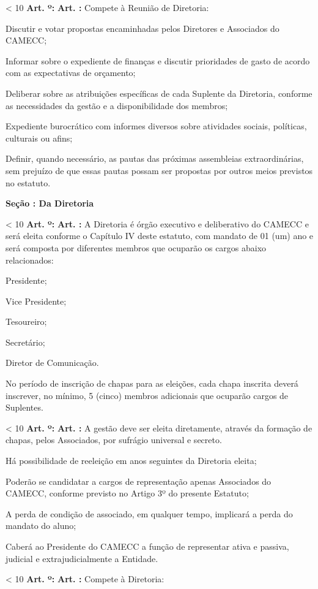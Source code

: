 \documentclass[capitulo]{br-lex}
\newcounter{chap}
\newcounter{sec}
\newcounter{art}
\newcommand{\secao}[1]{
    \vspace{20pt}
    \textbf{Seção \Roman{sec}: #1}
    \stepcounter{sec}
}
\renewcommand{\artigo}{
    \ifnum\value{art} < 10
        \textbf{Art. \arabic{art}º:}
    \else
        \textbf{Art. \arabic{art}:}
    \fi
    \stepcounter{art}
    \setcounter{inciso}{0}
    \setcounter{paragrafo}{0}
}
\begin{document}
\artigo Compete à Reunião de Diretoria:

\inciso Discutir e votar propostas encaminhadas pelos Diretores e Associados do CAMECC;

\inciso Informar sobre o expediente de finanças e discutir prioridades de gasto de acordo com as expectativas de orçamento;

\inciso Deliberar sobre as atribuições específicas de cada Suplente da Diretoria, conforme as necessidades da gestão e a disponibilidade dos membros;

\inciso Expediente burocrático com informes diversos sobre atividades sociais, políticas, culturais ou afins;

\inciso Definir, quando necessário, as pautas das próximas assembleias extraordinárias, sem prejuízo de que essas pautas possam ser propostas por outros meios previstos no estatuto.

\secao{Da Diretoria}

\artigo A Diretoria é órgão executivo e deliberativo do CAMECC e será eleita conforme o Capítulo IV deste estatuto, com mandato de 01 (um) ano e será composta por diferentes membros que ocuparão os cargos abaixo relacionados:

\inciso Presidente;

\inciso Vice Presidente;

\inciso Tesoureiro;

\inciso Secretário;

\inciso Diretor de Comunicação.

\paragrafounico No período de inscrição de chapas para as eleições, cada chapa inscrita deverá inscrever, no mínimo, 5 (cinco) membros adicionais que ocuparão cargos de Suplentes.

\artigo A gestão deve ser eleita diretamente, através da formação de chapas, pelos Associados, por sufrágio universal e secreto.

\paragrafo Há possibilidade de reeleição em anos seguintes da Diretoria eleita;

\paragrafo Poderão se candidatar a cargos de representação apenas Associados do CAMECC, conforme previsto no Artigo 3º do presente Estatuto;

\paragrafo A perda de condição de associado, em qualquer tempo, implicará a perda do mandato do aluno;

\paragrafo Caberá ao Presidente do CAMECC a função de representar ativa e passiva, judicial e extrajudicialmente a Entidade.

\artigo Compete à Diretoria:
\end{document}

